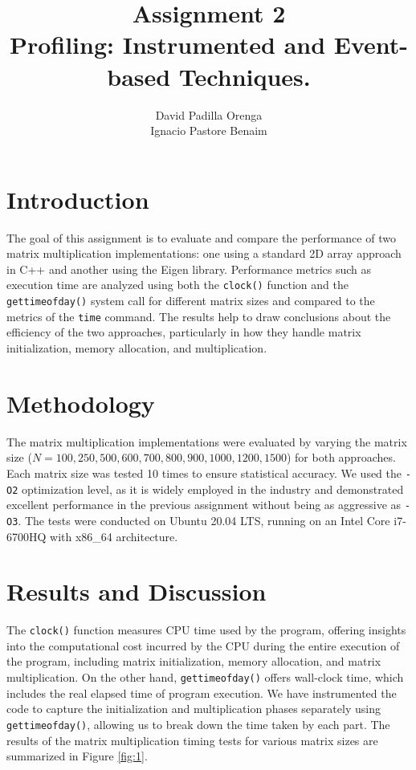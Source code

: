 \documentclass{article}
\title{Assignment 2 \\ \small Profiling: Instrumented and Event-based Techniques.}
\author{David Padilla Orenga\\ Ignacio Pastore Benaim}
\date{}  %
\begin{document}
\maketitle

\section{Introduction}
The goal of this assignment is to evaluate and compare the performance of two matrix multiplication implementations: one using a standard 2D array approach in C++ and another using the Eigen library. Performance metrics such as execution time are analyzed using both the \texttt{clock()} function and the \texttt{gettimeofday()} system call for different matrix sizes and compared to the metrics of the \texttt{time} command. The results help to draw conclusions about the efficiency of the two approaches, particularly in how they handle matrix initialization, memory allocation, and multiplication.


\section{Methodology}

The matrix multiplication implementations were evaluated by varying the matrix size (\(N = 100, 250, 500, 600, 700, 800, 900, 1000, 1200, 1500\)) for both approaches. Each matrix size was tested 10 times to ensure statistical accuracy. We used the \texttt{-O2} optimization level, as it is widely employed in the industry and demonstrated excellent performance in the previous assignment without being as aggressive as \texttt{-O3}. The tests were conducted on Ubuntu 20.04 LTS, running on an Intel Core i7-6700HQ with x86\_64 architecture.


\section{Results and Discussion}

The \texttt{clock()} function measures CPU time used by the program, offering insights into the computational cost incurred by the CPU during the entire execution of the program, including matrix initialization, memory allocation, and matrix multiplication. On the other hand, \texttt{gettimeofday()} offers wall-clock time, which includes the real elapsed time of program execution. We have instrumented the code to capture the initialization and multiplication phases separately using \texttt{gettimeofday()}, allowing us to break down the time taken by each part.
The results of the matrix multiplication timing tests for various matrix sizes are summarized in Figure \ref{fig:1}. 
\end{document}
